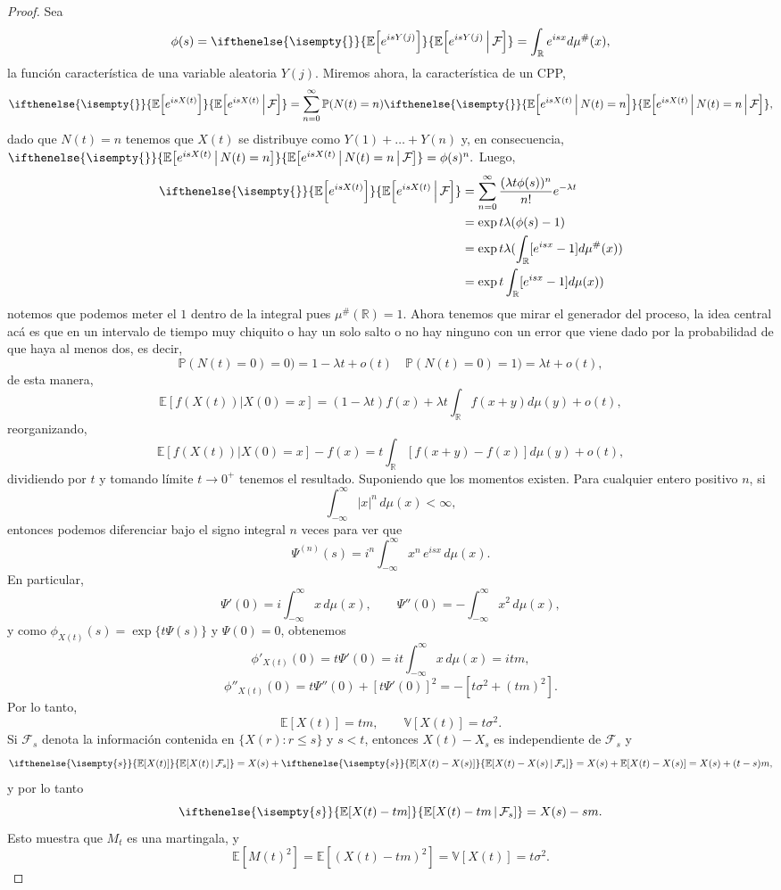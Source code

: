 \documentclass[
marginals=nomargin
]{kaohandt}
\renewcommand{\P}{\mathbb{P}}
\newcommand{\E}{\mathbb{E}}
\newcommand{\R}{\mathbb{R}}
\newcommand{\mean}[2][]{%
	\ifthenelse{\isempty{#1}}%
	{\mathbb{E}\!\left[#2\right]}%
	{\mathbb{E}\!\left[#2\,\middle|\,\mathcal{F}_{#1}\right]}%
}
\begin{document}
	\begin{proof}
		Sea 
		$$\phi(s) = \mean{e^{isY(j)}} = \int_{\R} e^{isx} d\mu^{\#}(x),$$
		la función característica de una variable aleatoria $Y(j)$. Miremos ahora, la característica de un CPP,
		$$\mean{e^{isX(t)}} = \sum_{n=0}^{\infty} \P(N(t) = n)\mean{e^{isX(t)} \, \middle| \, N(t) = n},$$
		dado que $N(t) = n$ tenemos que $X(t)$ se distribuye como $Y(1) + \dots + Y(n)$ y, en consecuencia, $\mean{e^{isX(t)} \, \middle| \, N(t) = n} = \phi(s)^n.$ Luego,
		\[
		\begin{aligned}
			\mean{e^{isX(t)}} &= \sum_{n=0}^{\infty} \frac{(\lambda t \phi(s))^{n}}{n!} e^{-\lambda t} \\
							  &= \exp{t \lambda(\phi(s) - 1)} \\
							  &= \exp{t \lambda(\int_{\R} [e^{isx} - 1] d\mu^{\#}(x))} \\
							  &= \exp{t \int_{\R} [e^{isx} - 1] d\mu(x))} 
		\end{aligned} 
		\]
		notemos que podemos meter el $1$ dentro de la integral pues $\mu^{\#}(\R) = 1.$  Ahora tenemos que mirar el generador del proceso, la idea central acá es que en un intervalo de tiempo muy chiquito o hay un solo salto o no hay ninguno con un error que viene dado por la probabilidad de que haya al menos dos, es decir,
		$$ \P(N(t) = 0) = 0) = 1 - \lambda t + o(t) \quad  \P(N(t) = 0) = 1) = \lambda t + o(t),$$
		de esta manera,
		$$ \E[f(X(t)) | X(0) = x] = (1 - \lambda t)f(x) + \lambda t \int_{\R} f(x + y) d\mu(y) + o(t),$$
		reorganizando,
		$$ \E[f(X(t)) | X(0) = x] - f(x) = t \int_{\R} [f(x + y) - f(x)] d\mu(y) + o(t),$$
		dividiendo por $t$ y tomando límite $t \to 0^{+}$ tenemos el resultado.
		Suponiendo que los momentos existen. Para cualquier entero positivo $n$, si
		$$\int_{-\infty}^{\infty} |x|^n\, d\mu(x) < \infty,$$
		entonces podemos diferenciar bajo el signo integral $n$ veces para ver que
		$$\Psi^{(n)}(s) = i^n \int_{-\infty}^{\infty} x^n\, e^{isx}\, d\mu(x).$$
		En particular,
		$$\Psi'(0) = i\int_{-\infty}^{\infty} x\, d\mu(x), \qquad \Psi''(0) = -\int_{-\infty}^{\infty} x^2\, d\mu(x),$$
		y como $\phi_{X(t)}(s) = \exp\{t\Psi(s)\}$ y $\Psi(0)=0$, obtenemos
		$$\phi'_{X(t)}(0) = t\Psi'(0) = it\int_{-\infty}^{\infty} x\, d\mu(x) = itm,$$
		$$\phi''_{X(t)}(0) = t\Psi''(0) + [t\Psi'(0)]^2 = -[t\sigma^2 + (tm)^2].$$
		Por lo tanto,
		$$\E[X(t)] = tm, \qquad \mathbb{V}[X(t)] = t\sigma^2.$$
		Si $\mathcal{F}_s$ denota la información contenida en $\{X(r) : r\leq s\}$ y $s<t$, entonces $X(t) - X_s$ es independiente de $\mathcal{F}_s$ y
		$$\mean[s]{X(t)} = X(s) + \mean[s]{X(t) - X(s)} = X(s) + \E[X(t) - X(s)] = X(s) + (t-s)m,$$
		y por lo tanto
		$$\mean[s]{X(t) - tm} = X(s) - sm.$$
		Esto muestra que $M_t$ es una martingala, y
		$$\E[M(t)^2] = \E[(X(t)-tm)^2] = \mathbb{V}[X(t)] = t\sigma^2.$$
	\end{proof}	
	
\end{document}

